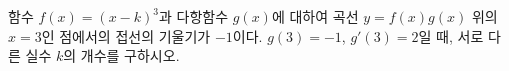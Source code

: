 함수 $f(x)=(x-k)^3$과 다항함수 $g(x)$에 대하여 곡선 $y=f(x)g(x)$ 위의 $x=3$인 점에서의 접선의 기울기가 $-1$이다. $g(3)=-1$, $g'(3)=2$일 때, 서로 다른 실수 $k$의 개수를 구하시오.
